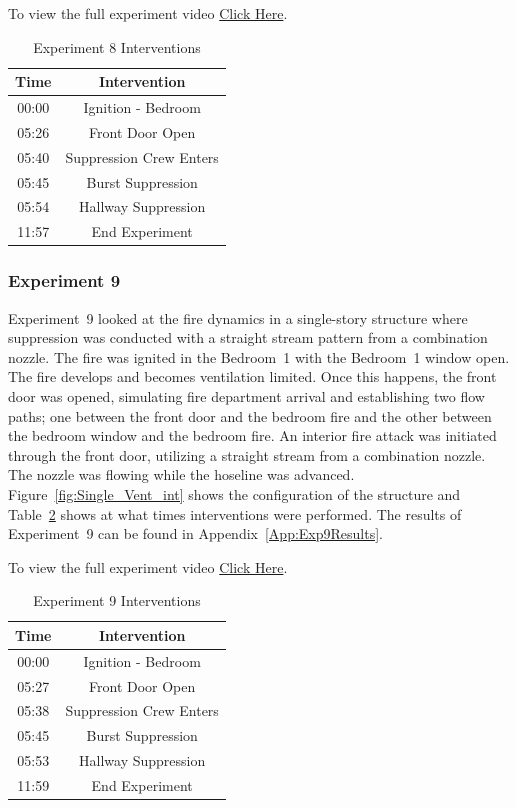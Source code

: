 \documentclass[12pt,oneside]{book}
\begin{document}
To view the full experiment video \href{https://player.vimeo.com/video/170499608?autoplay=1}{Click Here}.

\begin{table}[H]
	\centering
	\caption{Experiment 8 Interventions}
	\begin{tabular}{|c|c|} 
		\hline
		Time & Intervention \\ \hline \hline
		00:00 & Ignition - Bedroom \\ \hline
		05:26 & Front Door Open \\ \hline
		05:40 & Suppression Crew Enters\\ \hline
		05:45 & Burst Suppression \\ \hline 
		05:54 & Hallway Suppression \\ \hline
		11:57 & End Experiment\\ \hline
	\end{tabular}
	\label{Table:Exp8Interventions}
\end{table}

\FloatBarrier

\subsubsection{Experiment 9}
Experiment~9 looked at the fire dynamics in a single-story structure where suppression was conducted with a straight stream pattern from a combination nozzle. The fire was ignited in the Bedroom~1 with the Bedroom~1 window open. The fire develops and becomes ventilation limited. Once this happens, the front door was opened, simulating fire department arrival and establishing two flow paths; one between the front door and the bedroom fire and the other between the bedroom window and the bedroom fire. An interior fire attack was initiated through the front door, utilizing a straight stream from a combination nozzle. The nozzle was flowing while the hoseline was advanced. Figure~\ref{fig:Single_Vent_int} shows the configuration of the structure and Table~\ref{Table:Exp9Interventions} shows at what times interventions were performed. The results of Experiment~9 can be found in Appendix~\ref{App:Exp9Results}. 

To view the full experiment video \href{https://player.vimeo.com/video/170510938?autoplay=1}{Click Here}.

\begin{table}[H]
	\centering
	\caption{Experiment 9 Interventions}
	\begin{tabular}{|c|c|} 
		\hline
		Time & Intervention \\ \hline \hline
		00:00 & Ignition - Bedroom \\ \hline
		05:27 & Front Door Open \\ \hline
		05:38 & Suppression Crew Enters\\ \hline
		05:45 & Burst Suppression \\ \hline 
		05:53 & Hallway Suppression \\ \hline
		11:59 & End Experiment\\ \hline
	\end{tabular}
	\label{Table:Exp9Interventions}
\end{table}
\end{document}
